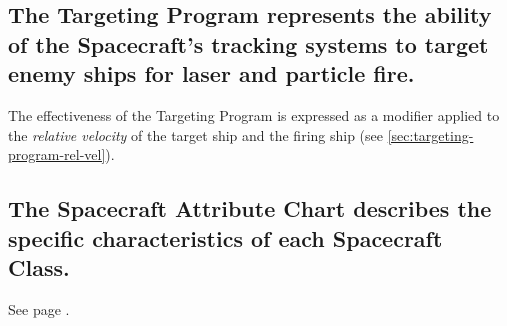 \subsection[Targeting Program]{The Targeting Program represents the
  ability of the Spacecraft's tracking systems to target enemy ships  
  for laser and particle fire.}
\label{sec:targeting-program}



The effectiveness of the Targeting Program is expressed as a modifier
applied to the \emph{relative velocity} of the target ship and the
firing ship (see \ref{sec:targeting-program-rel-vel}).


\subsection[Spacecraft Attribute Chart]{The Spacecraft Attribute Chart
  describes the specific 
  characteristics of each Spacecraft Class.}
\label{sec:spacecraft-attribute-chart}

See page \pageref{tab:spacecraft-attribute}.

